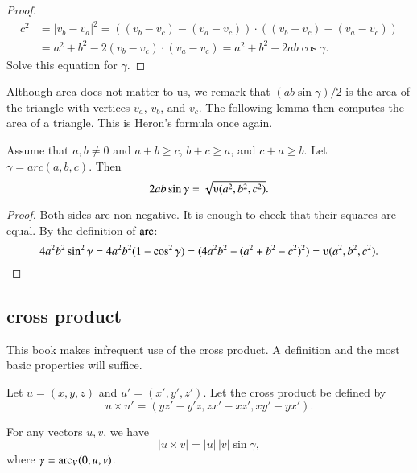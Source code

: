 \begin{proof}
    $$\begin{array}{lll}c^2 &= |v_b - v_a|^2 = ((v_b - v_c) - (v_a - v_c))\cdot ((v_b - v_c) - (v_a -
    v_c)) \\ &= a^2 + b^2 - 2 (v_b - v_c)\cdot (v_a - v_c) = a^2 +b ^2 - 2 a b
    \cos\gamma.
    \end{array}$$
    Solve this equation for $\gamma$.  
\end{proof}

Although area does not matter to us, we remark
that $(a b \sin\gamma)/2$ is the area of the
triangle with vertices $v_a$, $v_b$, and $v_c$.  The following
lemma then
computes the area of a triangle.  This is Heron's formula
once again.

\begin{lemma}
Assume that $a,b\ne 0$ and $a+b\ge c$, $b+c\ge a$, and $c+a\ge b$.
Let $\gamma=arc(a,b,c)$.  Then
        $$2 a b \sin\gamma = \sqrt{\ups(a^2,b^2,c^2)}.$$
\end{lemma}

\begin{proof}  Both sides are non-negative.  It is enough to check
that their squares are equal.  By the definition of $\operatorname{arc}$:
      $$4 a^2 b^2 \sin^2\gamma = 4 a^2 b^2 (1-\cos^2\gamma) = (4 a^2 b^2 - (a^2 + b^2 -
      c^2)^2) = \ups(a^2,b^2,c^2).$$
\end{proof}








\subsection{cross product}%

This book makes infrequent use of the cross product.
A definition and the most basic properties will suffice.

\begin{definition}   Let $u =(x,y,z)$ and $u' = (x',y',z')$.  
Let the cross product be defined
by
    $$
    u \times u' = (y z' - y' z, z x' - x z', x y' - y x').
    $$
\end{definition}

\begin{lemma}  
For any vectors $u,v$, we have 
    $$|u \times v| = |u|\,|v|\sin\gamma,$$
where $\gamma=\operatorname{arc}_V(0,u,v)$.
\end{lemma}

